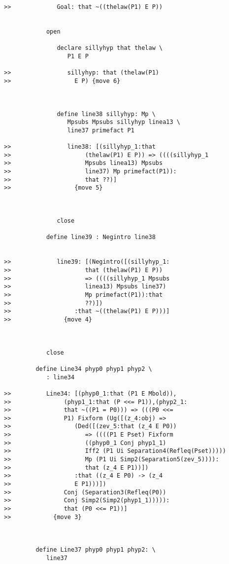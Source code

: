 \documentclass[12pt]{article}
\begin{document}
\begin{verbatim}
>>             Goal: that ~((thelaw(P1) E P))


            open

               declare sillyhyp that thelaw \
                  P1 E P

>>                sillyhyp: that (thelaw(P1)
>>                  E P) {move 6}



               define line38 sillyhyp: Mp \
                  Mpsubs Mpsubs sillyhyp linea13 \
                  line37 primefact P1

>>                line38: [(sillyhyp_1:that
>>                     (thelaw(P1) E P)) => ((((sillyhyp_1
>>                     Mpsubs linea13) Mpsubs
>>                     line37) Mp primefact(P1)):
>>                     that ??)]
>>                  {move 5}



               close

            define line39 : Negintro line38


>>             line39: [(Negintro([(sillyhyp_1:
>>                     that (thelaw(P1) E P))
>>                     => ((((sillyhyp_1 Mpsubs
>>                     linea13) Mpsubs line37)
>>                     Mp primefact(P1)):that
>>                     ??)])
>>                  :that ~((thelaw(P1) E P)))]
>>               {move 4}



            close

         define Line34 phyp0 phyp1 phyp2 \
            : line34

>>          Line34: [(phyp0_1:that (P1 E Mbold)),
>>               (phyp1_1:that (P <<= P1)),(phyp2_1:
>>               that ~((P1 = P0))) => (((P0 <<=
>>               P1) Fixform (Ug([(z_4:obj) =>
>>                  (Ded([(zev_5:that (z_4 E P0))
>>                     => ((((P1 E Pset) Fixform
>>                     ((phyp0_1 Conj phyp1_1)
>>                     Iff2 (P1 Ui Separation4(Refleq(Pset)))))
>>                     Mp (P1 Ui Simp2(Separation5(zev_5)))):
>>                     that (z_4 E P1))])
>>                  :that ((z_4 E P0) -> (z_4
>>                  E P1)))])
>>               Conj (Separation3(Refleq(P0))
>>               Conj Simp2(Simp2(phyp1_1))))):
>>               that (P0 <<= P1))]
>>            {move 3}



         define Line37 phyp0 phyp1 phyp2: \
            line37


\end{verbatim}
\end{document}
